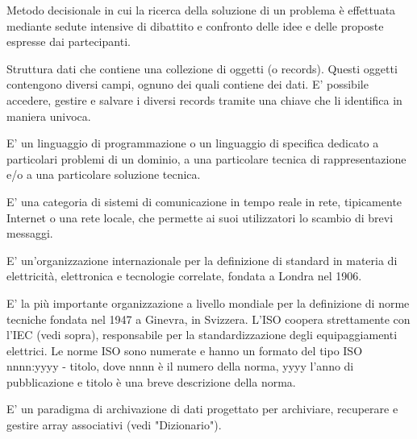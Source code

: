 \documentclass{scalatekids-article}
\begin{document}
 Metodo decisionale in cui la ricerca della soluzione di un problema è effettuata mediante sedute intensive di dibattito e confronto delle idee e delle proposte espresse dai partecipanti.



 Struttura dati che contiene una collezione di oggetti (o records).
Questi oggetti contengono diversi campi, ognuno dei quali contiene dei dati.
E' possibile accedere, gestire e salvare i diversi records tramite una chiave che li identifica in maniera univoca.

 E' un linguaggio di programmazione o un linguaggio di specifica dedicato a particolari problemi di un dominio, a una particolare tecnica di rappresentazione e/o a una particolare soluzione tecnica.






 E' una categoria di sistemi di comunicazione in tempo reale in rete, tipicamente Internet o una rete locale, che permette ai suoi utilizzatori lo scambio di brevi messaggi.

 E' un'organizzazione internazionale per la definizione di standard in materia di elettricità, elettronica e tecnologie correlate, fondata a Londra nel 1906.

 E' la più importante organizzazione a livello mondiale per la definizione di norme tecniche fondata nel 1947 a Ginevra, in Svizzera.
L'ISO coopera strettamente con l'IEC (vedi sopra), responsabile per la standardizzazione degli equipaggiamenti elettrici.
Le norme ISO sono numerate e hanno un formato del tipo ISO nnnn:yyyy - titolo, dove nnnn è il numero della norma, yyyy l'anno di pubblicazione e titolo è una breve descrizione della norma.



 E' un paradigma di archivazione di dati progettato per archiviare, recuperare e gestire array associativi (vedi "Dizionario").
\end{document}
